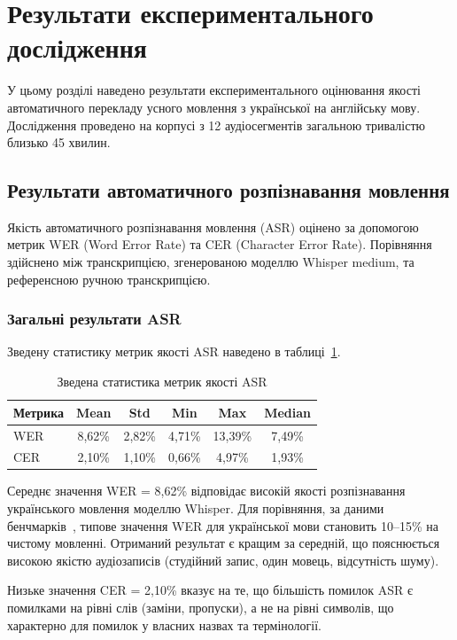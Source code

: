 \section{Результати експериментального дослідження}
\label{sec:results}

У цьому розділі наведено результати експериментального оцінювання якості
автоматичного перекладу усного мовлення з української на англійську мову.
Дослідження проведено на корпусі з 12 аудіосегментів загальною тривалістю
близько 45 хвилин.

\subsection{Результати автоматичного розпізнавання мовлення}

Якість автоматичного розпізнавання мовлення (ASR) оцінено за допомогою
метрик WER (Word Error Rate) та CER (Character Error Rate). Порівняння
здійснено між транскрипцією, згенерованою моделлю Whisper medium, та
референсною ручною транскрипцією.

\subsubsection{Загальні результати ASR}

Зведену статистику метрик якості ASR наведено в таблиці~\ref{tab:asr_summary}.

\begin{table}[h]
\centering
\caption{Зведена статистика метрик якості ASR}
\label{tab:asr_summary}
\begin{tabular}{|l|c|c|c|c|c|}
\hline
\textbf{Метрика} & \textbf{Mean} & \textbf{Std} & \textbf{Min} & \textbf{Max} & \textbf{Median} \\
\hline
WER & 8,62\% & 2,82\% & 4,71\% & 13,39\% & 7,49\% \\
CER & 2,10\% & 1,10\% & 0,66\% & 4,97\% & 1,93\% \\
\hline
\end{tabular}
\end{table}

Середнє значення WER = 8,62\% відповідає високій якості розпізнавання
українського мовлення моделлю Whisper. Для порівняння, за даними
бенчмарків~\cite{whisper}, типове значення WER для української мови
становить 10--15\% на чистому мовленні. Отриманий результат є кращим
за середній, що пояснюється високою якістю аудіозаписів (студійний запис,
один мовець, відсутність шуму).

Низьке значення CER = 2,10\% вказує на те, що більшість помилок ASR
є помилками на рівні слів (заміни, пропуски), а не на рівні символів,
що характерно для помилок у власних назвах та термінології.

